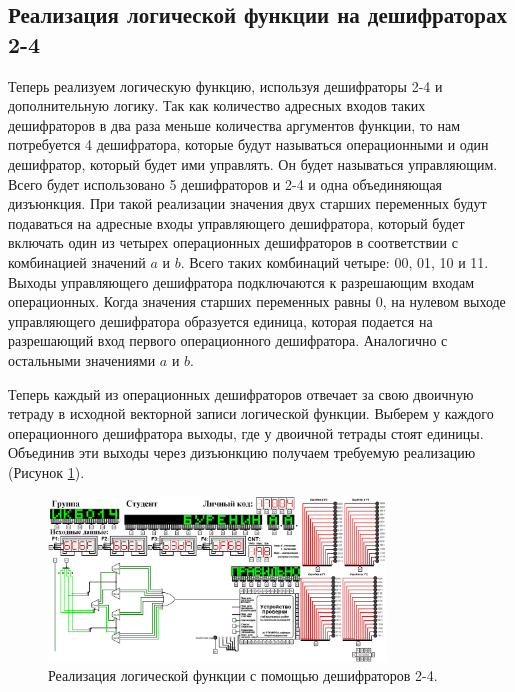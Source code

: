 \documentclass[a4paper]{article}
\begin{document}
	\subsection{Реализация логической функции на дешифраторах 2-4}
	
	Теперь реализуем логическую функцию, используя дешифраторы 2-4 и дополнительную логику. Так как количество адресных входов таких дешифраторов в два раза меньше количества аргументов функции, то нам потребуется 4 дешифратора, которые будут называться операционными и один дешифратор, который будет ими управлять. Он будет называться управляющим. Всего будет использовано 5 дешифраторов и 2-4 и одна объединяющая дизъюнкция. При такой реализации значения двух старших переменных будут подаваться на адресные входы управляющего дешифратора, который будет включать один из четырех операционных дешифраторов в соответствии с комбинацией значений $ a $ и $ b $. Всего таких комбинаций четыре: 00, 01, 10 и 11. Выходы управляющего дешифратора подключаются к разрешающим входам операционных. Когда значения старших переменных равны 0, на нулевом выходе управляющего дешифратора образуется единица, которая подается на разрешающий вход первого операционного дешифратора. Аналогично с остальными значениями $ a $ и $ b $. 
	
	Теперь каждый из операционных дешифраторов отвечает за свою двоичную тетраду в исходной векторной записи логической функции. Выберем у каждого операционного дешифратора выходы, где у двоичной тетрады стоят единицы. Объединив эти выходы через дизъюнкцию получаем требуемую реализацию (Рисунок \ref{img:decoder-2-4}).
	
	\begin{figure}[h]
		\centering
		\includegraphics[width=0.8\textwidth]{2-4.png}
		
		\caption{\centering Реализация логической функции с помощью дешифраторов 2-4.}
		\label{img:decoder-2-4}
	\end{figure}
	
	
\end{document}
